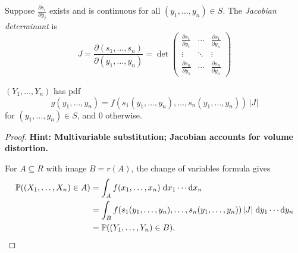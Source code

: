 \documentclass[a4paper]{article}
\begin{document}
\begin{defi}
  Suppose $\frac{\partial s_i}{\partial y_j}$ exists and is continuous for all $(y_1, \dotsc, y_n) \in S$. The \emph{Jacobian determinant} is
  \[
    J = \frac{\partial(s_1, \dotsc, s_n)}{\partial(y_1, \dotsc, y_n)} =
    \det
    \begin{pmatrix}
      \frac{\partial s_1}{\partial y_1} & \cdots & \frac{\partial s_1}{\partial y_n}\\
      \vdots & \ddots & \vdots\\
      \frac{\partial s_n}{\partial y_1} & \cdots & \frac{\partial s_n}{\partial y_n}
    \end{pmatrix}
  \]
\end{defi}

\begin{prop}
  $(Y_1, \dotsc, Y_n)$ has pdf
  \[
    g(y_1, \dotsc, y_n) = f(s_1(y_1, \dotsc, y_n), \dotsc, s_n(y_1, \dotsc, y_n))\,|J|
  \]
  for $(y_1, \dotsc, y_n) \in S$, and $0$ otherwise.
\end{prop}

\begin{proof}
  \textbf{Hint: Multivariable substitution; Jacobian accounts for volume distortion.}

  For $A \subseteq R$ with image $B = r(A)$, the change of variables formula gives
  \begin{align*}
    \mathbb{P}((X_1, \dotsc, X_n) \in A) &= \int_A f(x_1, \dotsc, x_n)\;\mathrm{d} x_1 \dotsm \mathrm{d} x_n\\
    &= \int_B f(s_1(y_1, \dotsc, y_n), \dotsc, s_n(y_1, \dotsc, y_n))\,|J|\;\mathrm{d} y_1 \dotsm \mathrm{d} y_n\\
    &= \mathbb{P}((Y_1, \dotsc, Y_n) \in B).\qedhere
  \end{align*}
\end{proof}
\end{document}
